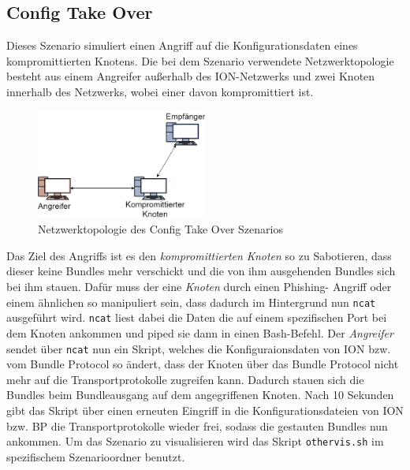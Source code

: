 \documentclass{article}
\begin{document}
\subsection{Config Take Over}
Dieses Szenario simuliert einen Angriff auf die Konfigurationsdaten eines kompromittierten Knotens. Die bei dem Szenario verwendete Netzwerktopologie besteht aus einem Angreifer außerhalb des ION-Netzwerks und zwei Knoten innerhalb des Netzwerks, wobei einer davon kompromittiert ist.
\par
\begin{figure}[h]
\centering
\includegraphics[width=0.5\textwidth]{cto}
\caption{Netzwerktopologie des Config Take Over Szenarios}
\end{figure}
Das Ziel des Angriffs ist es den \textit{kompromittierten Knoten} so zu Sabotieren, dass dieser keine Bundles mehr verschickt und die von ihm ausgehenden Bundles sich bei ihm stauen.
Dafür muss der eine \textit{Knoten} durch einen Phishing- Angriff oder einem ähnlichen so manipuliert sein, dass dadurch im Hintergrund nun \texttt{ncat} ausgeführt wird. \texttt{ncat} liest dabei die Daten die auf einem spezifischen Port bei dem Knoten ankommen und piped sie dann in einen Bash-Befehl.
Der \textit{Angreifer} sendet über \texttt{ncat} nun ein Skript, welches die Konfiguraionsdaten von ION bzw. vom Bundle Protocol so ändert, dass der Knoten über das Bundle Protocol nicht mehr auf die Transportprotokolle zugreifen kann. Dadurch stauen sich die Bundles beim Bundleausgang auf dem angegriffenen Knoten.
Nach 10 Sekunden gibt das Skript über einen erneuten Eingriff in die Konfigurationsdateien von ION bzw. BP die Transportprotokolle wieder frei, sodass die gestauten Bundles nun ankommen.
Um das Szenario zu visualisieren wird das Skript \texttt{othervis.sh} im spezifischem Szenarioordner benutzt.
\end{document}
